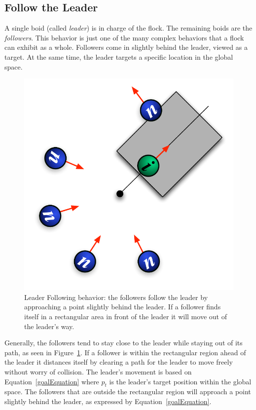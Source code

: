 \subsection{Follow the Leader}
A single boid (called \textit{leader}) is in charge of the flock. The remaining boids are the \textit{followers}. This behavior is just one of the many complex behaviors that a flock can exhibit as a whole. Followers come in slightly behind the leader, viewed as a target. At the same time, the leader targets a specific location in the global space.

\begin{figure}[htbp]
\begin{center}
\includegraphics[scale=0.75]{figures/leaderFollowing.pdf}
\caption{Leader Following behavior: the followers follow the leader by approaching a point slightly behind the leader. If a follower finds itself in a rectangular area in front of the leader it will move out of the leader's way.}
\label{leaderPDF}
\end{center}
\end{figure}

Generally, the followers tend to stay close to the leader while staying out of its path, as seen in Figure~\ref{leaderPDF}. If a follower is within the rectangular region ahead of the leader it distances itself by clearing a path for the leader to move freely without worry of collision. The leader's movement is  based on Equation~\ref{goalEquation} where $p_t$ is the leader's target position within the global space. The followers that are outside the rectangular region will approach a point slightly behind the leader, as expressed by Equation~\ref{goalEquation}.

